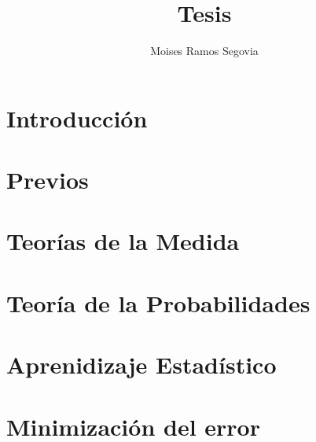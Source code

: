 \documentclass[12pt,a4paper,openany]{book}
\author{Moises Ramos Segovia}
\title{Tesis}
\begin{document}
	
	
	\chapter{Introducción}
	
	\chapter{Previos}
	
	\chapter{Teorías de la Medida}
	
	\chapter{Teoría de la Probabilidades}
	
	\chapter{Aprenidizaje Estadístico}
	
	\chapter{Minimización del error}
\end{document}

